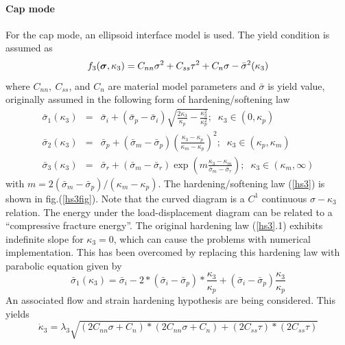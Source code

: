 \documentclass[a4paper]{article}
\newcommand{\mbf}[1]{\mbox{\boldmath$#1$}}
\newcommand{\del}[2]{\mbox{$\displaystyle\frac{#1}{#2}$}}
\newcommand{\sig}{\mbf{\sigma}}
\begin{document}
\paragraph{Cap mode}
For the cap mode, an ellipsoid interface model is used. The yield condition is assumed as
\begin{equation}
  f_3(\sig, \kappa_3) = C_{nn}\sigma^2+C_{ss}\tau^2 + C_n\sigma-\bar{\sigma}^2(\kappa_3)
\end{equation}
where $C_{nn},\ C_{ss}$, and $C_n$ are material model parameters and $\bar{\sigma}$ is yield value, originally assumed in the following form of hardening/softening law \cite{Rots}
\begin{eqnarray}
  \nonumber
  \bar{\sigma}_1(\kappa_3)&=&\bar{\sigma}_i+(\bar{\sigma}_p-\bar{\sigma}_i)\sqrt{\del{2\kappa_3}{\kappa_p}-\del{\kappa_3^2}{\kappa_p^2}};\;\;\kappa_3\in(0,\kappa_p)\\
  \label{hs3}
  \bar{\sigma}_2(\kappa_3)&=&\bar{\sigma}_p+(\bar{\sigma}_m-\bar{\sigma}_p)\left(\del{\kappa_3-\kappa_p}{\kappa_m-\kappa_p}\right)^2;\;\;\kappa_3\in(\kappa_p, \kappa_m)\\
  \nonumber
  \bar{\sigma}_3(\kappa_3)&=&\bar{\sigma}_r+(\bar{\sigma}_m-\bar{\sigma}_r)\exp\left(m\del{\kappa_3-\kappa_m}{\bar{\sigma}_m-\bar{\sigma}_r}\right);\;\;\kappa_3\in(\kappa_m, \infty)
\end{eqnarray}
with $m=2(\bar{\sigma}_m-\bar{\sigma}_p)/(\kappa_m-\kappa_p)$. The hardening/softening law (\ref{hs3}) is shown in fig.(\ref{hs3fig}). Note that the curved diagram is a $C^1$ continuous $\sigma-\kappa_3$ relation. The energy under the load-displacement diagram can be related to a ``compressive fracture energy''.
The original hardening law (\ref{hs3}.1) exhibits indefinite slope for $\kappa_3=0$, which can cause the problems with numerical implementation. This has been overcomed by replacing this hardening law with parabolic equation given by
\begin{equation}
  \bar{\sigma}_1(\kappa_3) = \bar{\sigma}_i-2*(\bar{\sigma}_i-\bar{\sigma}_p)*\del{\kappa_3}{\kappa_p}+(\bar{\sigma}_i-\bar{\sigma}_p)\del{\kappa_3}{\kappa_p}
\end{equation}
An associated flow and strain hardening hypothesis are being considered. This yields
\begin{equation}
  \dot\kappa_3=\lambda_3\sqrt{(2C_{nn}\sigma+C_n)*(2C_{nn}\sigma+C_n) + (2C_{ss}\tau)*(2C_{ss}\tau)}
\end{equation}
\end{document}
